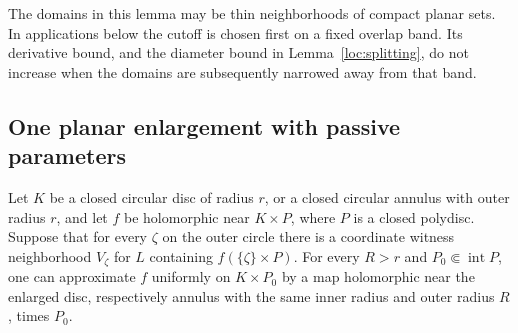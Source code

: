The domains in this lemma may be thin neighborhoods of compact
planar sets. In applications below the cutoff is chosen first on
a fixed overlap band. Its derivative bound, and the diameter bound
in Lemma~\ref{loc:splitting}, do not increase when the domains are
subsequently narrowed away from that band.

\subsection{One planar enlargement with passive parameters}

\begin{proposition}\label{loc:planar}
Let $K$ be a closed circular disc of radius $r$, or a closed
circular annulus with outer radius $r$, and let $f$ be holomorphic
near $K\times P$, where $P$ is a closed polydisc. Suppose that for
every $\zeta$ on the outer circle there is a coordinate witness
neighborhood $V_\zeta$ for $L$ containing $f(\{\zeta\}\times P)$.
For every $R>r$ and $P_0\Subset\operatorname{int}P$, one can
approximate $f$ uniformly on $K\times P_0$ by a map holomorphic
near the enlarged disc, respectively annulus with the same inner
radius and outer radius $R$, times $P_0$.
\end{proposition}

